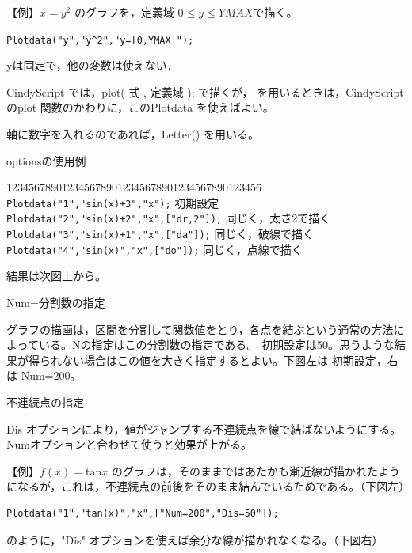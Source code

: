 \documentclass[papersize,a4paper,10pt,uplatex]{jsarticle}
\begin{document}
\begin{description}
\vspace{\baselineskip}
【例】$x=y^2$ のグラフを，定義域 $0 \leq y \leq YMAX$で描く。

\hspace{10mm} \verb|Plotdata("y","y^2","y=[0,YMAX]");|

yは固定で，他の変数は使えない．

\vspace{\baselineskip}
\hspace{20mm} 


CindyScript では，plot( 式 , 定義域 ); で描くが， \ketcindy を用いるときは，CindyScript のplot 関数のかわりに，このPlotdata を使えばよい。

軸に数字を入れるのであれば，Letter() を用いる。

\vspace{\baselineskip}
optionsの使用例
\begin{tabbing}
1234\=567890123456789012345678901234567890123456\=\kill
 \> \verb|Plotdata("1","sin(x)+3","x");| \> 初期設定\\
 \> \verb|Plotdata("2","sin(x)+2","x",["dr,2"]);| \> 同じく，太さ2で描く\\
 \> \verb|Plotdata("3","sin(x)+1","x",["da"]);|\> 同じく，破線で描く\\
 \> \verb|Plotdata("4","sin(x)","x",["do"]);|\> 同じく，点線で描く
 \end{tabbing}
結果は次図上から。

\vspace{\baselineskip}
\hspace{20mm} \scalebox{0.9}{} 

Num=分割数の指定

グラフの描画は，区間を分割して関数値をとり，各点を結ぶという通常の方法によっている。Nの指定はこの分割数の指定である。 初期設定は50。思うような結果が得られない場合はこの値を大きく指定するとよい。下図左は 初期設定，右は Num=200。

\vspace{\baselineskip}
\hspace{20mm}\scalebox{0.8}{ }

不連続点の指定

Dis オプションにより，値がジャンプする不連続点を線で結ばないようにする。Numオプションと合わせて使うと効果が上がる。

\vspace{\baselineskip}
【例】$f(x)=$tan$x$ のグラフは，そのままではあたかも漸近線が描かれたようになるが，これは，不連続点の前後をそのまま結んでいるためである。（下図左）
\begin{verbatim}
Plotdata("1","tan(x)","x",["Num=200","Dis=50"]);
\end{verbatim}
のように，"Dis" オプションを使えば余分な線が描かれなくなる。（下図右）


\end{description}
\end{document}
